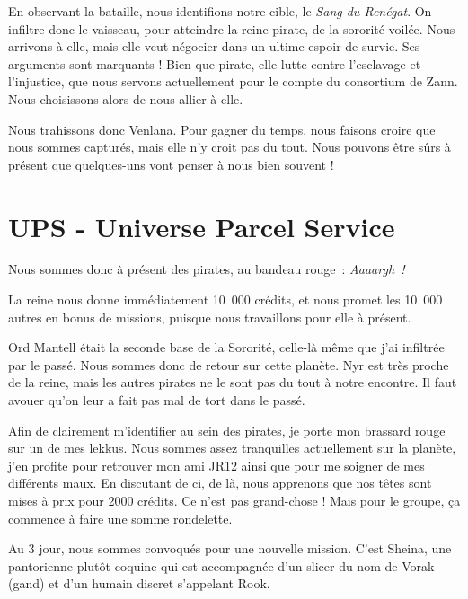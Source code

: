 \documentclass[a4paper,9pt,twoside,twocolumn,openany]{book}
\begin{document}
En observant la bataille, nous identifions notre cible, le \emph{Sang du Renégat}. On infiltre donc le vaisseau, pour atteindre la reine pirate, de la sororité voilée. Nous arrivons à elle, mais elle veut négocier dans un ultime espoir de survie. Ses arguments sont marquants ! Bien que pirate, elle lutte contre l'esclavage et l'injustice, que nous servons actuellement pour le compte du consortium de Zann. Nous choisissons alors de nous allier à elle.

Nous trahissons donc Venlana. Pour gagner du temps, nous faisons croire que nous sommes capturés, mais elle n'y croit pas du tout. Nous pouvons être sûrs à présent que quelques-uns vont penser à nous bien souvent !

\chapter{UPS - Universe Parcel Service}
\subtitle{2 septembre 2018 \newline Scénario custom}

Nous sommes donc à présent des pirates, au bandeau rouge\ : \emph{Aaaargh\ !}

La reine nous donne immédiatement 10\ 000 crédits, et nous promet les 10\ 000 autres en bonus de missions, puisque nous travaillons pour elle à présent.

Ord Mantell était la seconde base de la Sororité, celle-là même que j'ai infiltrée par le passé. Nous sommes donc de retour sur cette planète. Nyr est très proche de la reine, mais les autres pirates ne le sont pas du tout à notre encontre. Il faut avouer qu'on leur a fait pas mal de tort dans le passé.

Afin de clairement m'identifier au sein des pirates, je porte mon brassard rouge sur un de mes lekkus. Nous sommes assez tranquilles actuellement sur la planète, j'en profite pour retrouver mon ami JR12 ainsi que pour me soigner de mes différents maux. En discutant de ci, de là, nous apprenons que nos têtes sont mises à prix pour 2000 crédits. Ce n’est pas grand-chose ! Mais pour le groupe, ça commence à faire une somme rondelette.


Au 3\ieme{} jour, nous sommes convoqués pour une nouvelle mission. C'est Sheina, une pantorienne plutôt coquine qui est accompagnée d'un slicer du nom de Vorak (gand) et d'un humain discret s'appelant Rook.
\end{document}
